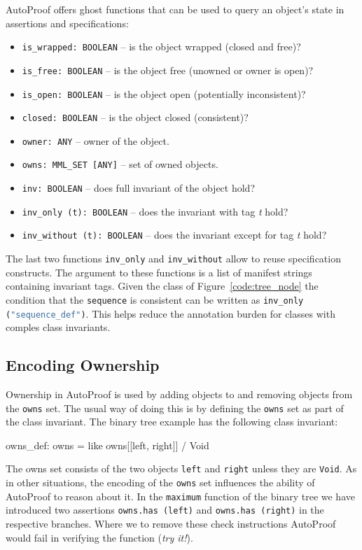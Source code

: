 \documentclass[a4paper,12pt]{article}
\newcommand{\AutoProof}{Auto\-Proof\xspace}
\newcommand{\e}[1]{\mbox{\lstinline[language=Eiffel]|#1|}}
\begin{document}
\AutoProof offers ghost functions that can be used to query an object's state in assertions and specifications:

\begin{itemize}
\item \e{is_wrapped: BOOLEAN} -- is the object wrapped (closed and free)?
\item \e{is_free: BOOLEAN} -- is the object free (unowned or owner is open)?
\item \e{is_open: BOOLEAN}  -- is the object open (potentially inconsistent)?
\item \e{closed: BOOLEAN} -- is the object closed (consistent)?
\item \e{owner: ANY} -- owner of the object.
\item \e{owns: MML_SET [ANY]} -- set of owned objects.
\item \e{inv: BOOLEAN} -- does full invariant of the object hold?
\item \e{inv_only (t): BOOLEAN} -- does the invariant with tag \emph{t} hold?
\item \e{inv_without (t): BOOLEAN} -- does the invariant except for tag \emph{t} hold?
\end{itemize}

The last two functions \e{inv_only} and \e{inv_without} allow to reuse specification constructs. The argument to these functions is a list of manifest strings containing invariant tags. Given the class of Figure~\ref{code:tree_node} the condition that the \e{sequence} is consistent can be written as \e{inv_only ("sequence_def")}. This helps reduce the annotation burden for classes with comples class invariants.


\subsection{Encoding Ownership}

Ownership in \AutoProof is used by adding objects to and removing objects from the \e{owns} set. The usual way of doing this is by defining the \e{owns} set as part of the class invariant. The binary tree example has the following class invariant:
\begin{erunning}[numbers=none]
owns_def: owns = {like owns}[[left, right]] / Void
\end{erunning}
The owns set consists of the two objects \e{left} and \e{right} unless they are \e{Void}. As in other situations, the encoding of the \e{owns} set influences the ability of \AutoProof to reason about it. In the \e{maximum} function of the binary tree we have introduced two assertions \e{owns.has (left)} and \e{owns.has (right)} in the respective branches. Where we to remove these check instructions \AutoProof would fail in verifying the function (\emph{try it!}). 
\end{document}
